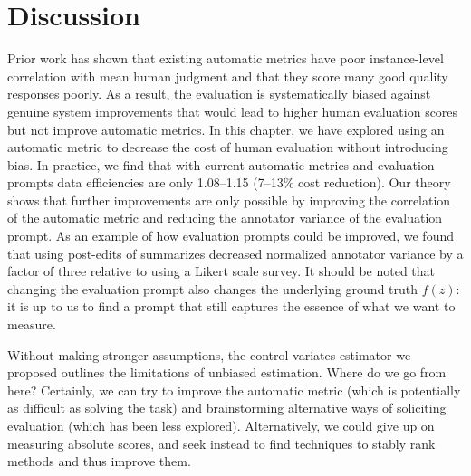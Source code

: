 \section{Discussion}
\label{sec:discussion}

Prior work has shown that existing automatic metrics have poor instance-level correlation with mean human judgment and that they score many good quality responses poorly.
As a result, the evaluation is systematically biased against genuine system improvements that would lead to higher human evaluation scores but not improve automatic metrics.
In this chapter, we have explored using an automatic metric to decrease the cost of human evaluation without introducing bias.
In practice, we find that with current automatic metrics and evaluation prompts data efficiencies are only 1.08--1.15 (7--13\% cost reduction).
Our theory shows that further improvements are only possible by improving the correlation of the automatic metric and reducing the annotator variance of the evaluation prompt.
As an example of how evaluation prompts could be improved, we found that using post-edits of summarizes decreased normalized annotator variance by a factor of three relative to using a Likert scale survey.
It should be noted that changing the evaluation prompt also changes the underlying ground truth $f(z)$: it is up to us to find a prompt that still captures the essence of what we want to measure.


Without making stronger assumptions, the control variates estimator we proposed outlines the limitations of unbiased estimation.
Where do we go from here?
Certainly, we can try to improve the automatic metric (which is potentially as difficult as solving the task) and brainstorming alternative ways of soliciting evaluation (which has been less explored).
Alternatively, we could give up on measuring absolute scores, and seek instead to find techniques to stably rank methods and thus improve them.

